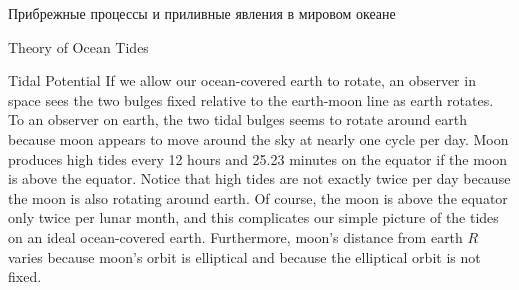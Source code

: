 \begin{chapter}{Прибрежные процессы и приливные явления в мировом океане}
\begin{section}{Theory of Ocean Tides}
\begin{paragraph}{Tidal Potential}
If we allow our ocean-covered earth to rotate, an observer in space
sees the two bulges fixed relative to the earth-moon line as earth
rotates. To an observer on earth, the two tidal bulges seems to rotate
around earth because moon appears to move around the sky at nearly one
cycle per day. Moon produces high tides every 12 hours and 25.23
minutes on the equator if the moon is above the equator. Notice that
high tides are not exactly twice per day because the moon is also
rotating around earth. Of course, the moon is above the equator only
twice per lunar month, and this complicates our simple picture of the
tides on an ideal ocean-covered earth.  Furthermore, moon's distance
from earth $R$ varies because moon's orbit is elliptical and because
the elliptical orbit is not fixed.
%


\end{paragraph}
\end{section}
\end{chapter}
